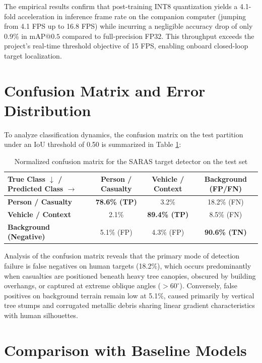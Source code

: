 The empirical results confirm that post-training INT8 quantization yields a 4.1-fold acceleration in inference frame rate on the companion computer (jumping from 4.1 FPS up to 16.8 FPS) while incurring a negligible accuracy drop of only 0.9\% in $\text{mAP@0.5}$ compared to full-precision FP32. This throughput exceeds the project's real-time threshold objective of 15 FPS, enabling onboard closed-loop target localization.

\section{Confusion Matrix and Error Distribution}

To analyze classification dynamics, the confusion matrix on the test partition under an IoU threshold of 0.50 is summarized in Table \ref{tab:confusion_matrix}:

\begin{table}[htbp]
\centering
\caption{Normalized confusion matrix for the SARAS target detector on the test set}
\label{tab:confusion_matrix}
\vspace{0.2cm}
\begin{tabular}{|l|c|c|c|}
\hline
\textbf{True Class $\downarrow$ / Predicted Class $\rightarrow$} & \textbf{Person / Casualty} & \textbf{Vehicle / Context} & \textbf{Background (FP/FN)} \\
\hline
\textbf{Person / Casualty} & \textbf{78.6\% (TP)} & 3.2\% & 18.2\% (FN) \\
\hline
\textbf{Vehicle / Context} & 2.1\% & \textbf{89.4\% (TP)} & 8.5\% (FN) \\
\hline
\textbf{Background (Negative)} & 5.1\% (FP) & 4.3\% (FP) & \textbf{90.6\% (TN)} \\
\hline
\end{tabular}
\end{table}

Analysis of the confusion matrix reveals that the primary mode of detection failure is false negatives on human targets (18.2\%), which occurs predominantly when casualties are positioned beneath heavy tree canopies, obscured by building overhangs, or captured at extreme oblique angles ($>60^\circ$). Conversely, false positives on background terrain remain low at 5.1\%, caused primarily by vertical tree stumps and corrugated metallic debris sharing linear gradient characteristics with human silhouettes.

\section{Comparison with Baseline Models}


